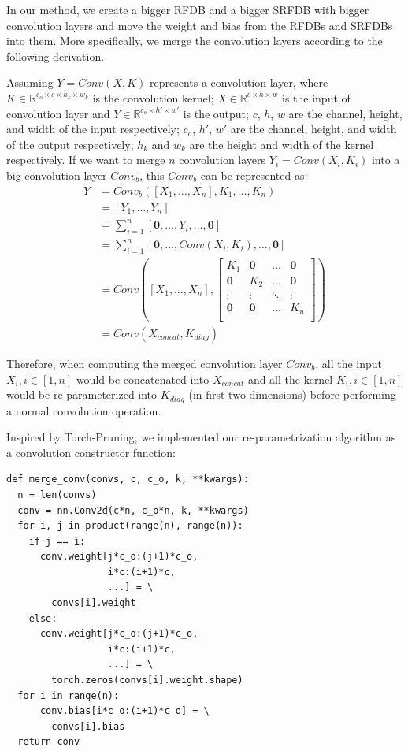 \documentclass[10pt,twocolumn,letterpaper]{article}
\begin{document}
In our method, we create a bigger RFDB and a bigger SRFDB with bigger convolution layers and move the weight and bias from the RFDBs and SRFDBs into them.
More specifically, we merge the convolution layers according to the following derivation.

Assuming $Y=Conv(X, K)$ represents a convolution layer,
where $K\in\mathbb{R}^{c_o\times c\times h_k\times w_k}$ is the convolution kernel; $X\in\mathbb{R}^{c\times h\times w}$ is the input of convolution layer and $Y\in\mathbb{R}^{c_o\times h'\times w'}$ is the output; 
$c$, $h$, $w$ are the channel, height, and width of the input respectively; 
$c_o$, $h'$, $w'$ are the channel, height, and width of the output respectively;
$h_k$ and $w_k$ are the height and width of the kernel respectively.
If we want to merge $n$ convolution layers $Y_i=Conv(X_i, K_i)$ into a big convolution layer $Conv_b$, this $Conv_b$ can be represented as:
\begin{equation}
  \begin{aligned}
    Y&=Conv_b([X_1,\dots,X_n], K_1,\dots,K_n)\\
    &=[Y_1,\dots,Y_n]\\
    &=\sum_{i=1}^n[\bm 0,\dots,Y_i,\dots,\bm 0]\\
    &=\sum_{i=1}^n[\bm 0,\dots,Conv(X_i, K_i),\dots,\bm 0]\\
    &=Conv([X_1,\dots,X_n], 
    \begin{bmatrix}
      K_1 & \bm 0 & \dots & \bm 0 \\
      \bm 0 & K_2 & \dots & \bm 0 \\
      \vdots & \vdots & \ddots & \vdots \\
      \bm 0 & \bm 0 & \dots & K_n \\
    \end{bmatrix})\\
    &=Conv(X_{concat}, K_{diag})
  \end{aligned}
\end{equation}

Therefore, when computing the merged convolution layer $Conv_b$, all the input $X_i, i\in[1,n]$ would be concatenated into $X_{concat}$ and all the kernel $K_i, i\in[1,n]$ would be re-parameterized into $K_{diag}$ (in first two dimensions) before performing a normal convolution operation.

Inspired by Torch-Pruning\cite{fang2023depgraph}, we implemented our re-parametrization algorithm as a convolution constructor function:
\begin{verbatim}
def merge_conv(convs, c, c_o, k, **kwargs):
  n = len(convs)
  conv = nn.Conv2d(c*n, c_o*n, k, **kwargs)
  for i, j in product(range(n), range(n)):
    if j == i:
      conv.weight[j*c_o:(j+1)*c_o,
                  i*c:(i+1)*c,
                  ...] = \
        convs[i].weight
    else:
      conv.weight[j*c_o:(j+1)*c_o,
                  i*c:(i+1)*c,
                  ...] = \
        torch.zeros(convs[i].weight.shape)
  for i in range(n):
      conv.bias[i*c_o:(i+1)*c_o] = \
        convs[i].bias
  return conv
\end{verbatim}
\end{document}
